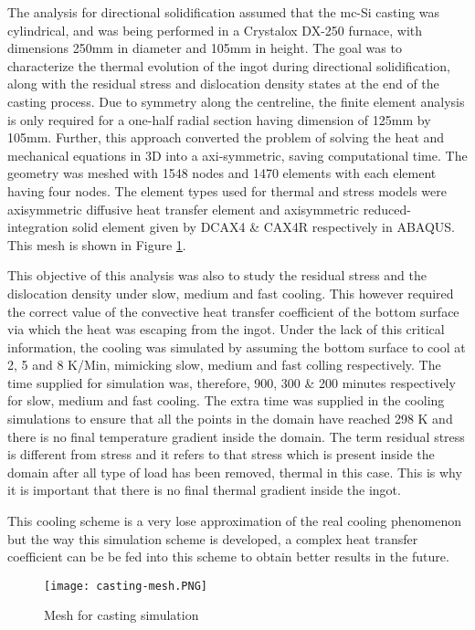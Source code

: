 The analysis for directional solidification assumed that the mc-Si casting was cylindrical, and was being performed in a Crystalox DX-250 furnace, with dimensions 250mm in diameter and 105mm in height. The goal was to characterize the thermal evolution of the ingot during directional solidification, along with the residual stress and dislocation density states at the end of the casting process. Due to symmetry along the centreline, the finite element analysis is only required for a one-half radial section having dimension of 125mm by 105mm. Further, this approach converted the problem of solving the heat and mechanical equations in 3D into a axi-symmetric, saving computational time. The geometry was meshed with 1548 nodes and 1470 elements with each element having four nodes. The element types used for thermal and stress models were axisymmetric diffusive heat transfer element and axisymmetric reduced-integration solid element given by DCAX4 \& CAX4R respectively in ABAQUS. This mesh is shown in Figure \ref{fig:casting-mesh}.

This objective of this analysis was also to study the residual stress and the dislocation density under slow, medium and fast cooling. This however required the correct value of the convective heat transfer coefficient of the bottom surface via which the heat was escaping from the ingot. Under the lack of this critical information, the cooling was simulated by assuming the bottom surface to cool at 2, 5 and 8 K/Min, mimicking slow, medium and fast colling respectively. The time supplied for simulation was, therefore,  900, 300 \& 200 minutes respectively for slow, medium and fast cooling. The extra time was supplied in the cooling simulations to ensure that all the points in the domain have reached 298 K and there is no final temperature gradient inside the domain. The term residual stress is different from stress and it refers to that stress which is present inside the domain after all type of load has been removed, thermal in this case. This is why it is important that there is no final thermal gradient inside the ingot. 

This cooling scheme is a very lose approximation of the real cooling phenomenon but the way this simulation scheme is developed, a complex heat transfer coefficient can be be fed into this scheme to obtain better results in the future.


\begin{figure}[h]
    \centering
    \texttt{[image: casting-mesh.PNG]}
    \caption{Mesh for casting simulation}
    \label{fig:casting-mesh}
\end{figure}

